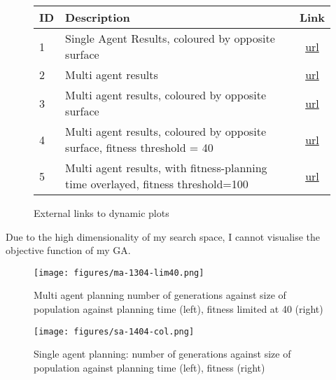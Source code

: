 
\begin{figure}[ht]
\centering
\begin{tabular}{| l | l | c |}
  \hline
  ID & Description & Link \\
  \hline
  1 & Single Agent Results, coloured by opposite surface& \href{https://barrett370.github.io/Y4-Diss/single-agent-result-1404-col}{url} \\
  2 & Multi agent results & \href{https://barrett370.github.io/Y4-Diss/multi-agent-result-1304}{url} \\
  3 & Multi agent results, coloured by opposite surface & \href{https://barrett370.github.io/Y4-Diss/multi-agent-result-1904-col}{url} \\
  4 & Multi agent results, coloured by opposite surface, fitness threshold = 40 & \href{https://barrett370.github.io/Y4-Diss/multi-agent-result-1304-lim40-col}{url} \\
  5 & Multi agent results, with fitness-planning time overlayed, fitness threshold=100 & \href{https://barrett370.github.io/Y4-Diss/multi-agent-result-shared-lim100}{url} \\


  \hline
\end{tabular}
\caption{\label{tab:plotlinks} External links to dynamic plots}
\end{figure}

Due to the high dimensionality of my search space, I cannot visualise the objective function of my GA.

\begin{figure}[ht]
  \centering
  \texttt{[image: figures/ma-1304-lim40.png]}
  \caption{\label{fig:ma-lim40} Multi agent planning number of generations against size of population against planning time (left), fitness limited at 40 (right)}
\end{figure}

\begin{figure}[ht]
  \centering
  \texttt{[image: figures/sa-1404-col.png]}
  \caption{\label{fig:sa-col} Single agent planning: number of generations against size of population against planning time (left), fitness (right)}
\end{figure}
